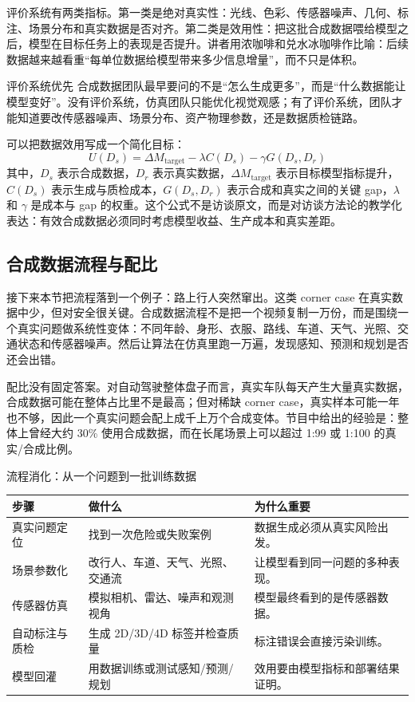 评价系统有两类指标。第一类是绝对真实性：光线、色彩、传感器噪声、几何、标注、场景分布和真实数据是否对齐。第二类是效用性：把这批合成数据喂给模型之后，模型在目标任务上的表现是否提升。讲者用浓咖啡和兑水冰咖啡作比喻：后续数据越来越看重“每单位数据给模型带来多少信息增量”，而不只是体积。

\begin{importantbox}{评价系统优先}
合成数据团队最早要问的不是“怎么生成更多”，而是“什么数据能让模型变好”。没有评价系统，仿真团队只能优化视觉观感；有了评价系统，团队才能知道要改传感器噪声、场景分布、资产物理参数，还是数据质检链路。
\end{importantbox}

可以把数据效用写成一个简化目标：
\[
U(D_s)=\Delta M_{\mathrm{target}}-\lambda C(D_s)-\gamma G(D_s,D_r)
\]
其中，$D_s$ 表示合成数据，$D_r$ 表示真实数据，$\Delta M_{\mathrm{target}}$ 表示目标模型指标提升，$C(D_s)$ 表示生成与质检成本，$G(D_s,D_r)$ 表示合成和真实之间的关键 gap，$\lambda$ 和 $\gamma$ 是成本与 gap 的权重。这个公式不是访谈原文，而是对访谈方法论的教学化表达：有效合成数据必须同时考虑模型收益、生产成本和真实差距。

\subsection{合成数据流程与配比}

接下来本节把流程落到一个例子：路上行人突然窜出。这类 corner case 在真实数据中少，但对安全很关键。合成数据流程不是把一个视频复制一万份，而是围绕一个真实问题做系统性变体：不同年龄、身形、衣服、路线、车道、天气、光照、交通状态和传感器噪声。然后让算法在仿真里跑一万遍，发现感知、预测和规划是否还会出错。

配比没有固定答案。对自动驾驶整体盘子而言，真实车队每天产生大量真实数据，合成数据可能在整体占比里不是最高；但对稀缺 corner case，真实样本可能一年也不够，因此一个真实问题会配上成千上万个合成变体。节目中给出的经验是：整体上曾经大约 30\% 使用合成数据，而在长尾场景上可以超过 1:99 或 1:100 的真实/合成比例。

\begin{knowledgebox}{流程消化：从一个问题到一批训练数据}
\begin{tabularx}{\textwidth}{p{}p{}X}
\toprule
步骤 & 做什么 & 为什么重要 \\
\midrule
真实问题定位 & 找到一次危险或失败案例 & 数据生成必须从真实风险出发。 \\
场景参数化 & 改行人、车道、天气、光照、交通流 & 让模型看到同一问题的多种表现。 \\
传感器仿真 & 模拟相机、雷达、噪声和观测视角 & 模型最终看到的是传感器数据。 \\
自动标注与质检 & 生成 2D/3D/4D 标签并检查质量 & 标注错误会直接污染训练。 \\
模型回灌 & 用数据训练或测试感知/预测/规划 & 效用要由模型指标和部署结果证明。 \\
\bottomrule
\end{tabularx}
\end{knowledgebox}

